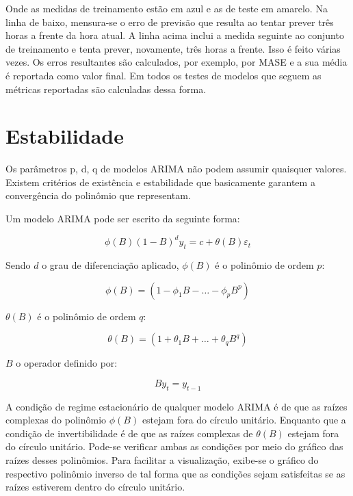 \documentclass[
	12pt,				%
	openright,			%
	oneside,			%
	a4paper,			%
	english,			%
	french,				%
	spanish,			%
	brazil				%
	]{abntex2}
\begin{document}
Onde as medidas de treinamento estão em azul e as de teste em amarelo. Na linha de baixo, mensura-se o erro de previsão que resulta ao tentar prever três horas a frente da hora atual. A linha acima inclui a medida seguinte ao conjunto de treinamento e tenta prever, novamente, três horas a frente. Isso é feito várias vezes. Os erros resultantes são calculados, por exemplo, por MASE e a sua média é reportada como valor final. Em todos os testes de modelos que seguem as métricas reportadas são calculadas dessa forma.

\section{Estabilidade}

Os parâmetros p, d, q de modelos ARIMA não podem assumir quaisquer valores. Existem critérios de existência e estabilidade que basicamente garantem a convergência do polinômio que representam.

Um modelo ARIMA pode ser escrito da seguinte forma: 


\begin{equation}
\phi(B)(1-B)^dy_t = c + \theta(B)\varepsilon_t
\end{equation}

Sendo $d$ o grau de diferenciação aplicado, $\phi(B)$ é o polinômio de ordem $p$:

\begin{equation}
\phi(B) = (1-\phi_1B-\dots-\phi_pB^p)
\end{equation}

$\theta(B)$ é o polinômio de ordem $q$:

\begin{equation}
\theta(B) = (1+\theta_1B+\dots+\theta_qB^q)
\end{equation}

$B$ o operador definido por:

\begin{equation}
By_{t} = y_{t-1}
\end{equation}

A condição de regime estacionário de qualquer modelo ARIMA é de que as raízes complexas do polinômio $\phi(B)$ estejam fora do círculo unitário. Enquanto que a condição de invertibilidade é de que as raízes complexas de $\theta(B)$ estejam fora do círculo unitário. Pode-se verificar ambas as condições por meio do gráfico das raízes desses polinômios. Para facilitar a visualização, exibe-se o gráfico do respectivo polinômio inverso de tal forma que as condições sejam satisfeitas se as raízes estiverem dentro do círculo unitário.
\end{document}
